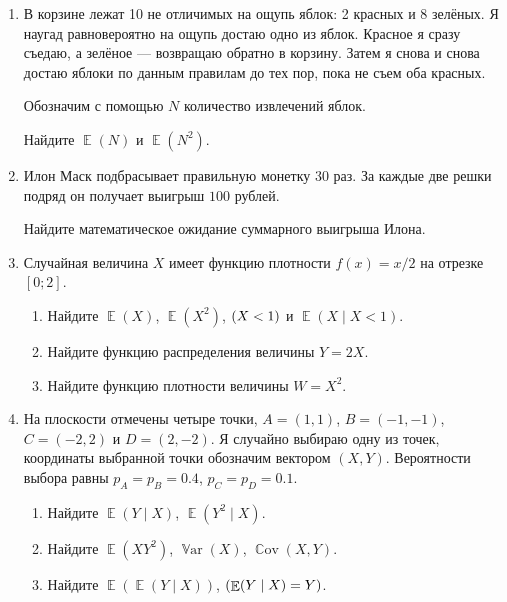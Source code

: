 \documentclass[12pt]{article}
\DeclareMathOperator{\Cov}{\mathbb{C}ov}
\DeclareMathOperator{\Var}{\mathbb{V}ar}
\let\P\relax
\DeclareMathOperator{\P}{\mathbb{P}}
\DeclareMathOperator{\E}{\mathbb{E}}
\begin{document}
\begin{enumerate}
    \item %
    В корзине лежат 10 не отличимых на ощупь яблок: 2 красных и 8 зелёных. 
    Я наугад равновероятно на ощупь достаю одно из яблок.
    Красное я сразу съедаю, а зелёное — возвращаю обратно в корзину. 
    Затем я снова и снова достаю яблоки по данным правилам до тех пор, пока не съем оба красных. 

    Обозначим с помощью $N$ количество извлечений яблок. 

    Найдите $\E(N)$ и $\E(N^2)$.
    
    \item %
    Илон Маск подбрасывает правильную монетку 30 раз. 
    За каждые две решки подряд он получает выигрыш $100$ рублей. 

    Найдите математическое ожидание суммарного выигрыша Илона. 
    
    
    \item %
    Случайная величина $X$ имеет функцию плотности $f(x) = x/2$ на отрезке $[0;2]$. 

    \begin{enumerate}
        \item Найдите $\E(X)$, $\E(X^2)$, $\P(X < 1)$ и $\E(X \mid X < 1)$.
        \item Найдите функцию распределения величины $Y = 2X$.
        \item Найдите функцию плотности величины $W = X^2$.
    \end{enumerate}

    \item %
    На плоскости отмечены четыре точки, $A = (1, 1)$, $B = (-1, -1)$, $C = (-2, 2)$ и $D = (2, -2)$.
Я случайно выбираю одну из точек, координаты выбранной точки обозначим вектором $(X, Y)$.
Вероятности выбора равны $p_A = p_B = 0.4$, $p_C = p_D = 0.1$.


\begin{enumerate}
    \item Найдите $\E(Y \mid X)$, $\E(Y^2 \mid X)$.
    \item Найдите $\E(XY^2)$, $\Var(X)$, $\Cov(X, Y)$.
    \item Найдите $\E(\E(Y \mid X))$, $\P(\E(Y \mid X) = Y)$.
\end{enumerate}



\end{enumerate}
\end{document}
